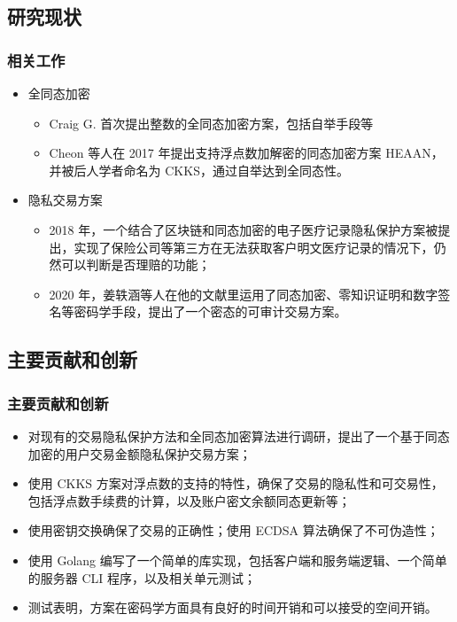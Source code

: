 \subsection{研究现状}

\begin{frame}
    \frametitle{相关工作}

    \begin{itemize}
        \item 全同态加密
        \begin{itemize}
            \item Craig G. 首次提出整数的全同态加密方案，包括自举手段等
            \item Cheon 等人在 2017 年提出支持浮点数加解密的同态加密方案 HEAAN，并被后人学者命名为 CKKS，通过自举达到全同态性。
        \end{itemize}
        \item 隐私交易方案 
        \begin{itemize}
            \item 2018 年，一个结合了区块链和同态加密的电子医疗记录隐私保护方案被提出，实现了保险公司等第三方在无法获取客户明文医疗记录的情况下，仍然可以判断是否理赔的功能；
            \item 2020 年，姜轶涵等人在他的文献里运用了同态加密、零知识证明和数字签名等密码学手段，提出了一个密态的可审计交易方案。
        \end{itemize}
    \end{itemize}

\end{frame}

\subsection{主要贡献和创新}

\begin{frame}
    \frametitle{主要贡献和创新}

    \begin{itemize}
        \item 对现有的交易隐私保护方法和全同态加密算法进行调研，提出了一个基于同态加密的用户交易金额隐私保护交易方案；
        \item 使用 CKKS 方案对浮点数的支持的特性，确保了交易的隐私性和可交易性，包括浮点数手续费的计算，以及账户密文余额同态更新等；
        \item 使用密钥交换确保了交易的正确性；使用 ECDSA 算法确保了不可伪造性；
        \item 使用 Golang 编写了一个简单的库实现，包括客户端和服务端逻辑、一个简单的服务器 CLI 程序，以及相关单元测试；
        \item 测试表明，方案在密码学方面具有良好的时间开销和可以接受的空间开销。
    \end{itemize}

\end{frame}

